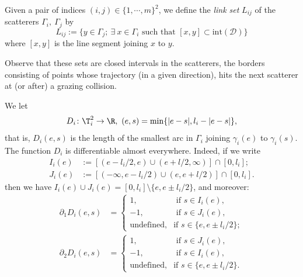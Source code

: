 \documentclass[reqno,11pt]{amsart}
\begin{document}
\begin{defi} Given a pair of indices \( (i, j) \in \{1, \cdots, m\}^2 \), we define the \emph{link set} \( L_{ij} \) of the scatterers \( \Gamma_i, \ \Gamma_j \) by
\[
	L_{ij} := \{ y \in \Gamma_j  ; \ \exists \  x \in \Gamma_i \text{ such that } [x,y] \subset \mathrm{int}(\mathcal{D}) \}
\]
where \(  [x,y] \) is the line segment joining \( x \) to \( y \).
\end{defi}
Observe that these sets are closed intervals in the scatterers, the borders consisting of points whose trajectory (in a given direction), hits the next scatterer at (or after) a grazing collision.
\par We let
\[
D_i\colon \T^2_i \to \R, \ (e,s) = \min\{|e-s|, l_i-|e-s|\},
\]
that is, \( D_i(e,s)\) is the length of the smallest arc in \( \Gamma_i \) joining \(\gamma_i(e) \) to \( \gamma_i(s). \)
The function \( D_i \) is differentiable almost everywhere. 
Indeed, if we write 
\[
\begin{split}
    I_i(e) &:= [(e-l_i/2, e) \cup (e+l/2, \infty)] \cap [0,l_i]; \\
    J_i(e) &:= [(-\infty, e-l_i/2) \cup (e, e+l/2)] \cap [0,l_i].
\end{split}
\]
then we have \( I_i(e) \cup J_i(e) = [0, l_i]\setminus\{e, e \pm l_i/2\} \), and moreover:
\begin{equation}\label{eq:enriched_length_curved_part}
\begin{split}
    \partial_1D_i(e,s) &= \left\{
    \begin{array}{lcl} 
            1, &\text{ if } s \in I_i(e), \\
            -1, &\text{ if } s \in J_i(e), \\
            \text{undefined,} &\text{if } s \in \{e, e \pm l_i/2\};             
        \end{array}
        \right. \\
    \partial_2D_i(e,s) & = \left\{
    \begin{array}{lcl} 
            1, &\text{ if } s \in J_i(e), \\
            -1, &\text{ if } s \in I_i(e), \\
            \text{undefined,} &\text{if } s \in \{e, e \pm l_i/2\}.            
        \end{array}
        \right. 
\end{split}
\end{equation}
\end{document}
